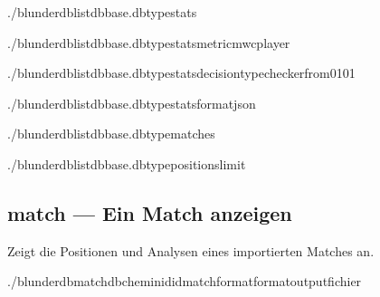 \documentclass[letterpaper,10pt,german]{sphinxmanual}
\begin{document}
\begin{sphinxVerbatim}[commandchars=\\\{\}]
./blunderdblist\PYGZhy{}\PYGZhy{}dbbase.db\PYGZhy{}\PYGZhy{}typestats

./blunderdblist\PYGZhy{}\PYGZhy{}dbbase.db\PYGZhy{}\PYGZhy{}typestats\PYGZhy{}\PYGZhy{}metricmwc\PYGZhy{}\PYGZhy{}player

./blunderdblist\PYGZhy{}\PYGZhy{}dbbase.db\PYGZhy{}\PYGZhy{}typestats\PYGZhy{}\PYGZhy{}decision\PYGZhy{}typechecker\PYGZhy{}\PYGZhy{}from\PYGZhy{}01\PYGZhy{}01

./blunderdblist\PYGZhy{}\PYGZhy{}dbbase.db\PYGZhy{}\PYGZhy{}typestats\PYGZhy{}\PYGZhy{}formatjson

./blunderdblist\PYGZhy{}\PYGZhy{}dbbase.db\PYGZhy{}\PYGZhy{}typematches

./blunderdblist\PYGZhy{}\PYGZhy{}dbbase.db\PYGZhy{}\PYGZhy{}typepositions\PYGZhy{}\PYGZhy{}limit
\end{sphinxVerbatim}


\subsection{match — Ein Match anzeigen}
\label{\detokenize{cli:match-afficher-un-match}}
\sphinxAtStartPar
Zeigt die Positionen und Analysen eines importierten Matches an.

\begin{sphinxVerbatim}[commandchars=\\\{\}]
./blunderdbmatch\PYGZhy{}\PYGZhy{}db\PYGZlt{}chemin\PYGZgt{}\PYGZhy{}\PYGZhy{}id\PYGZlt{}id\PYGZus{}match\PYGZgt{}\PYG{o}{[}\PYGZhy{}\PYGZhy{}format\PYGZlt{}format\PYGZgt{}\PYG{o}{]}\PYG{o}{[}\PYGZhy{}\PYGZhy{}output\PYGZlt{}fichier\PYGZgt{}\PYG{o}{]}
\end{sphinxVerbatim}
\end{document}
